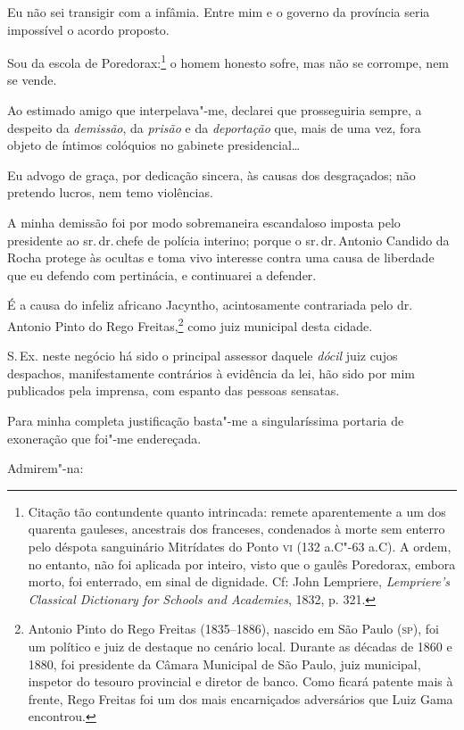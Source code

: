 Eu não sei transigir com a infâmia. Entre mim e o governo da província
seria impossível o acordo proposto.

Sou da escola de Poredorax:\footnote{Citação tão contundente quanto
  intrincada: remete aparentemente a um dos quarenta gauleses,
  ancestrais dos franceses, condenados à morte sem enterro pelo déspota
  sanguinário Mitrídates do Ponto \textsc{vi} (132 a.C"-63 a.C). A ordem, no
  entanto, não foi aplicada por inteiro, visto que o gaulês Poredorax,
  embora morto, foi enterrado, em sinal de dignidade. Cf: John
  Lempriere, \emph{Lempriere's Classical Dictionary for Schools and
  Academies}, 1832, p. 321.} o homem honesto sofre, mas não se
corrompe, nem se vende.

Ao estimado amigo que interpelava"-me, declarei que prosseguiria sempre,
a despeito da \emph{demissão}, da \emph{prisão} e da \emph{deportação}
que, mais de uma vez, fora objeto de íntimos colóquios no gabinete
presidencial\ldots{}

Eu advogo de graça, por dedicação sincera, às causas dos desgraçados;
não pretendo lucros, nem temo violências.

A minha demissão foi por modo sobremaneira escandaloso imposta pelo
presidente ao sr.\,dr.\,chefe de polícia interino; porque o sr.\,dr.\,Antonio Candido da Rocha protege às ocultas e toma vivo interesse contra
uma causa de liberdade que eu defendo com pertinácia, e continuarei a
defender.

É a causa do infeliz africano Jacyntho, acintosamente contrariada pelo
dr.\,Antonio Pinto do Rego Freitas,\footnote{Antonio Pinto do Rego
  Freitas (1835--1886), nascido em São Paulo (\textsc{sp}), foi um político e juiz
  de destaque no cenário local. Durante as décadas de 1860 e 1880, foi
  presidente da Câmara Municipal de São Paulo, juiz municipal, inspetor
  do tesouro provincial e diretor de banco. Como ficará patente mais à
  frente, Rego Freitas foi um dos mais encarniçados adversários que Luiz
  Gama encontrou.} como juiz municipal desta cidade.

S.\,Ex. neste negócio há sido o principal assessor daquele \emph{dócil}
juiz cujos despachos, manifestamente contrários à evidência da lei, hão
sido por mim publicados pela imprensa, com espanto das pessoas sensatas.

Para minha completa justificação basta"-me a singularíssima portaria de
exoneração que foi"-me endereçada.

Admirem"-na:

